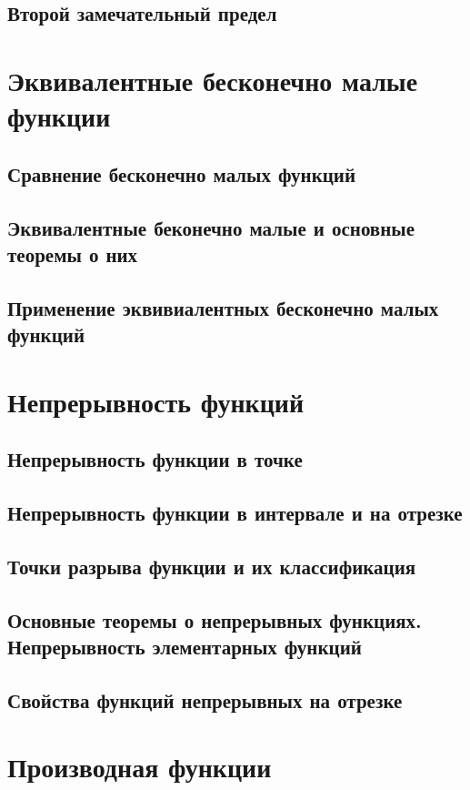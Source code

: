 \documentclass[14pt]{extreport}
\begin{document}
\section{Второй замечательный предел}



\chapter{Эквивалентные бесконечно малые функции}

\section{Сравнение бесконечно малых функций}

\section{Эквивалентные беконечно малые и основные теоремы о них}

\section{Применение эквивиалентных бесконечно малых функций}



\chapter{Непрерывность функций}

\section{Непрерывность функции в точке}

\section{Непрерывность функции в интервале и на отрезке}

\section{Точки разрыва функции и их классификация}

\section{Основные теоремы о непрерывных функциях. Непрерывность элементарных функций}

\section{Свойства функций непрерывных на отрезке}



\chapter{Производная функции}
\end{document}
